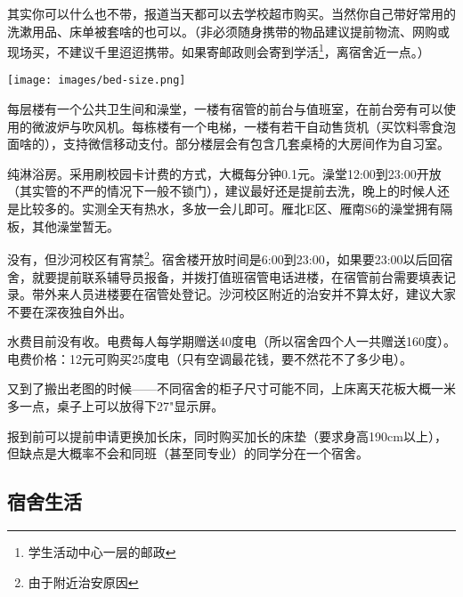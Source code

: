 
其实你可以什么也不带，报道当天都可以去学校超市购买。当然你自己带好常用的洗漱用品、床单被套啥的也可以。（非必须随身携带的物品建议提前物流、网购或现场买，不建议千里迢迢携带。如果寄邮政则会寄到学活\footnote{学生活动中心一层的邮政}，离宿舍近一点。）


\begin{center}
    \texttt{[image: images/bed-size.png]}
\end{center}


每层楼有一个公共卫生间和澡堂，一楼有宿管的前台与值班室，在前台旁有可以使用的微波炉与吹风机。每栋楼有一个电梯，一楼有若干自动售货机（买饮料零食泡面啥的），支持微信移动支付。部分楼层会有包含几套桌椅的大房间作为自习室。


纯淋浴房。采用刷校园卡计费的方式，大概每分钟0.1元。澡堂12:00到23:00开放（其实管的不严的情况下一般不锁门），建议最好还是提前去洗，晚上的时候人还是比较多的。实测全天有热水，多放一会儿即可。雁北E区、雁南S6的澡堂拥有隔板，其他澡堂暂无。


没有，但沙河校区有宵禁\footnote{由于附近治安原因}。宿舍楼开放时间是6:00到23:00，如果要23:00以后回宿舍，就要提前联系辅导员报备，并拨打值班宿管电话进楼，在宿管前台需要填表记录。带外来人员进楼要在宿管处登记。沙河校区附近的治安并不算太好，建议大家不要在深夜独自外出。


水费目前没有收。电费每人每学期赠送40度电（所以宿舍四个人一共赠送160度）。电费价格：12元可购买25度电（只有空调最花钱，要不然花不了多少电）。

又到了搬出老图的时候——不同宿舍的柜子尺寸可能不同，上床离天花板大概一米多一点，桌子上可以放得下27"显示屏。


报到前可以提前申请更换加长床，同时购买加长的床垫（要求身高190cm以上），但缺点是大概率不会和同班（甚至同专业）的同学分在一个宿舍。

\subsection{宿舍生活}



